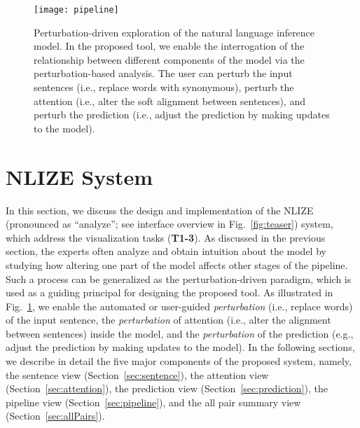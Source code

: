 \begin{figure}[htbp]
\centering
 \texttt{[image: pipeline]}
 \caption{
 Perturbation-driven exploration of the natural language inference model.
 In the proposed tool, we enable the interrogation of the relationship between different components of the model via the perturbation-based analysis.
 The user can perturb the input sentences (i.e., replace words with synonymous), perturb the attention (i.e., alter the soft alignment between sentences), and perturb the prediction (i.e., adjust the prediction by making updates to the model).
}
\label{fig:modelPipeline}
\end{figure}

\section{NLIZE System}
In this section, we discuss the design and implementation of the NLIZE (pronounced as ``analyze''; see interface overview in Fig.~\ref{fig:teaser}) system, which address the visualization tasks (\textbf{T1-3}).
%
As discussed in the previous section, the experts often analyze and obtain intuition about the model by studying how altering one part of the model affects other stages of the pipeline.
%
Such a process can be generalized as the perturbation-driven paradigm, which is used as a guiding principal for designing the proposed tool.
%
As illustrated in Fig.~\ref{fig:modelPipeline}, we enable the automated or user-guided \emph{perturbation} (i.e., replace words) of the input sentence, the \emph{perturbation} of attention (i.e., alter the alignment between sentences) inside the model, and the \emph{perturbation} of the prediction (e.g., adjust the prediction by making updates to the model).
%
In the following sections, we describe in detail the five major components of the proposed system, namely, the sentence view  (Section~\ref{sec:sentence}), the attention view (Section~\ref{sec:attention}), the prediction view (Section~\ref{sec:prediction}), the pipeline view (Section~\ref{sec:pipeline}), and the all pair summary view (Section~\ref{sec:allPairs}).




%

